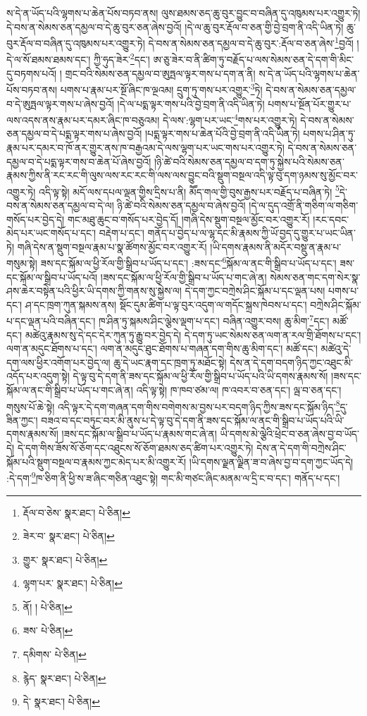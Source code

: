 ས་དེ་ན་ཡོད་པའི་ལྷགས་པ་ཆེན་པོས་བཏབ་ནས། ལུས་ཐམས་ཅད་ཆུ་བུར་བྱུང་བ་བཞིན་དུ་འཁུམས་པར་འགྱུར་ཏེ། དེ་བས་ན་སེམས་ཅན་དམྱལ་བ་དེ་ཆུ་བུར་ཅན་ཞེས་བྱའོ། །དེ་ལ་ཆུ་བུར་རྡོལ་བ་ཅན་གྱི་བྱེ་བྲག་ནི་འདི་ཡིན་ཏེ། ཆུ་བུར་རྡོལ་བ་བཞིན་དུ་འཁུམས་པར་འགྱུར་ཏེ། དེ་བས་ན་སེམས་ཅན་དམྱལ་བ་དེ་ཆུ་བུར་:རྡོལ་བ་ཅན་ཞེས་\footnote{རྡོལ་བ་ཅེས་  སྣར་ཐང་།  པེ་ཅིན། }བྱའོ། །དེ་ལ་སོ་ཐམས་ཐམས་དང་། ཀྱི་ཧུད་ཟེར་\footnote{ཟེར་བ་  སྣར་ཐང་།  པེ་ཅིན། }དང་། ཨ་ཅུ་ཟེར་བ་ནི་ཚིག་ཏུ་བརྗོད་པ་ལས་སེམས་ཅན་དེ་དག་གི་མིང་དུ་བཏགས་པའོ། །
གྲང་བའི་སེམས་ཅན་དམྱལ་བ་ཨུཏྤལ་ལྟར་གས་པ་དག་ན་ནི། ས་དེ་ན་ཡོད་པའི་ལྷགས་པ་ཆེན་པོས་བཏབ་ནས། པགས་པ་རྣམ་པར་སྔོ་ཞིང་ཁ་ལྔའམ། དྲུག་ཏུ་གས་པར་འགྱུར་\footnote{གྱུར་  སྣར་ཐང་།  པེ་ཅིན། }ཏེ། དེ་བས་ན་སེམས་ཅན་དམྱལ་བ་དེ་ཨུཏྤལ་ལྟར་གས་པ་ཞེས་བྱའོ། །དེ་ལ་པདྨ་ལྟར་གས་པའི་བྱེ་བྲག་ནི་འདི་ཡིན་ཏེ། པགས་པ་སྔོན་པོར་གྱུར་པ་ལས་འདས་ནས་རྣམ་པར་དམར་ཞིང་ཁ་བཅུའམ། དེ་ལས་:ལྷག་པར་ཡང་\footnote{ལྷག་པར་  སྣར་ཐང་།  པེ་ཅིན། }གས་པར་འགྱུར་ཏེ། དེ་བས་ན་སེམས་ཅན་དམྱལ་བ་དེ་པདྨ་ལྟར་གས་པ་ཞེས་བྱའོ། །པདྨ་ལྟར་གས་པ་ཆེན་པོའི་བྱེ་བྲག་ནི་འདི་ཡིན་ཏེ། པགས་པ་ཤིན་ཏུ་རྣམ་པར་དམར་བ་ཁོ་ནར་གྱུར་ནས་ཁ་བརྒྱའམ་དེ་ལས་ལྷག་པར་ཡང་གས་པར་འགྱུར་ཏེ། དེ་བས་ན་སེམས་ཅན་དམྱལ་བ་དེ་པདྨ་ལྟར་གས་བ་ཆེན་པོ་ཞེས་བྱའོ། །ཉི་ཚེ་བའི་སེམས་ཅན་དམྱལ་བ་དག་ཏུ་སྐྱེས་པའི་སེམས་ཅན་རྣམས་ཀྱིས་ནི་རང་རང་གི་ལུས་ལས་རང་རང་གི་ལས་ལས་བྱུང་བའི་སྡུག་བསྔལ་འདི་ལྟ་བུ་དག་ཉམས་སུ་མྱོང་བར་འགྱུར་ཏེ། འདི་ལྟ་སྟེ། མདོ་ལས་དཔལ་ལྡན་གྱིས་དྲིས་པ་ནི། མཽད་གལ་གྱི་བུས་རྒྱས་པར་བརྗོད་པ་བཞིན་ཏེ། \footnote{ནོ། །   པེ་ཅིན། }དེ་བས་ན་སེམས་ཅན་དམྱལ་བ་དེ་ལ། ཉི་ཚེ་བའི་སེམས་ཅན་དམྱལ་བ་ཞེས་བྱའོ། །དེ་ལ་དུད་འགྲོ་ནི་གཅིག་ལ་གཅིག་གསོད་པར་བྱེད་དེ། གང་མཐུ་ཆུང་བ་གསོད་པར་བྱེད་དོ། །གཞི་དེས་སྡུག་བསྔལ་མྱོང་བར་འགྱུར་རོ། །རང་དབང་མེད་པར་ཡང་གསོད་པ་དང་། བརྡེག་པ་དང་། གནོད་པ་བྱེད་པ་ལ་ལྷ་དང་མི་རྣམས་ཀྱི་ཡོ་བྱད་དུ་གྱུར་པ་ཡང་ཡིན་ཏེ། གཞི་དེས་ན་སྡུག་བསྔལ་རྣམ་པ་སྣ་ཚོགས་མྱོང་བར་འགྱུར་རོ། །ཡི་དགས་རྣམས་ནི་མདོར་བསྡུ་ན་རྣམ་པ་གསུམ་སྟེ། ཟས་དང་སྐོམ་ལ་ཕྱི་རོལ་གྱི་སྒྲིབ་པ་ཡོད་པ་དང་། :ཟས་དང་\footnote{ཟས་  པེ་ཅིན། }སྐོམ་ལ་ནང་གི་སྒྲིབ་པ་ཡོད་པ་དང་། ཟས་དང་སྐོམ་ལ་སྒྲིབ་པ་ཡོད་པའོ། །ཟས་དང་སྐོམ་ལ་ཕྱི་རོལ་གྱི་སྒྲིབ་པ་ཡོད་པ་གང་ཞེ་ན། སེམས་ཅན་གང་དག་སེར་སྣ་ཤས་ཆེར་བསྟེན་པའི་ཕྱིར་ཡི་དགས་ཀྱི་གནས་སུ་སྐྱེས་ལ། དེ་དག་ཀྱང་བཀྲེས་ཤིང་སྐོམ་པ་དང་ལྡན་པས། པགས་པ་དང་། ཤ་དང་ཁྲག་ཀུན་སྐམས་ནས། སྡོང་དུམ་ཚིག་པ་ལྟ་བུར་འདུག་ལ་གདོང་སྐྲས་ཁེབས་པ་དང་། བཀྲེས་ཤིང་སྐོམ་པ་དང་ལྡན་པའི་བཞིན་དང་། ཁ་ཤིན་ཏུ་སྐམས་ཤིང་ལྕེས་ལྡག་པ་དང་། བཞིན་འགྱུར་བས། ཆུ་མིག་\footnote{དམིགས་  པེ་ཅིན། }དང་། མཚོ་དང་། མཚེའུ་རྣམས་སུ་དེ་དང་དེར་ཀུན་ཏུ་རྒྱུ་བར་བྱེད་དེ། དེ་དག་ཏུ་ཡང་སེམས་ཅན་ལག་ན་རལ་གྲི་ཐོགས་པ་དང་། ལག་ན་མདུང་ཐོགས་པ་དང་། ལག་ན་མདུང་ཐུང་ཐོགས་པ་གཞན་དག་གིས་ཆུ་མིག་དང་། མཚོ་དང་། མཚེའུ་དེ་དག་ལས་ཕྱིར་འགོག་པར་བྱེད་ལ། ཆུ་དེ་ཡང་རྣག་དང་ཁྲག་ཏུ་མཐོང་སྟེ། དེས་ན་དེ་དག་བདག་ཉིད་ཀྱང་འཐུང་མི་འདོད་པར་འདུག་སྟེ། དེ་ལྟ་བུ་དེ་དག་ནི་ཟས་དང་སྐོམ་ལ་ཕྱི་རོལ་གྱི་སྒྲིབ་པ་ཡོད་པའི་ཡི་དགས་རྣམས་སོ། །ཟས་དང་སྐོམ་ལ་ནང་གི་སྒྲིབ་པ་ཡོད་པ་གང་ཞེ་ན། འདི་ལྟ་སྟེ། ཁ་ཁབ་ཙམ་ལ། ཁ་འབར་བ་ཅན་དང་། ལྦ་བ་ཅན་དང་། གསུས་པོ་ཆེ་སྟེ། འདི་ལྟར་དེ་དག་གཞན་དག་གིས་བགེགས་མ་བྱས་པར་བདག་ཉིད་ཀྱིས་ཟས་དང་སྐོམ་ཉིད་\footnote{རྙེད་  སྣར་ཐང་།  པེ་ཅིན། }དུ་ཟིན་ཀྱང་། བཟའ་བ་དང་བཏུང་བར་མི་ནུས་པ་དེ་ལྟ་བུ་དེ་དག་ནི་ཟས་དང་སྐོམ་ལ་ནང་གི་སྒྲིབ་པ་ཡོད་པའི་ཡི་དགས་རྣམས་སོ། །ཟས་དང་སྐོམ་ལ་སྒྲིབ་པ་ཡོད་པ་རྣམས་གང་ཞེ་ན། ཡི་དགས་མེ་ལྕེའི་ཕྲེང་བ་ཅན་ཞེས་བྱ་བ་ཡོད་དེ། དེ་དག་གིས་ཟོས་སོ་ཅོག་དང་འཐུངས་སོ་ཅོག་ཐམས་ཅད་ཚིག་པར་འགྱུར་ཏེ། དེས་ན་དེ་དག་གི་བཀྲེས་ཤིང་སྐོམ་པའི་སྡུག་བསྔལ་བ་རྣམས་ཀྱང་མེད་པར་མི་འགྱུར་རོ། །ཡི་དགས་ལྗན་ལྗིན་ཟ་བ་ཞེས་བྱ་བ་དག་ཀྱང་ཡོད་དེ། :དེ་དག་\footnote{དེ་  སྣར་ཐང་།  པེ་ཅིན། }ཁ་ཅིག་ནི་ཕྱི་ས་ཟ་ཞིང་གཅིན་འཐུང་སྟེ། གང་མི་གཙང་ཞིང་མནམ་ལ་དྲི་ང་བ་དང་། གནོད་པ་དང་། 